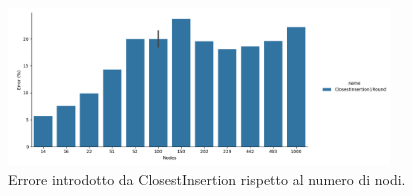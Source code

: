 \begin{figure}[!ht]
    \centering

    \includegraphics[width=0.9\textwidth]{./images/ClosestInsertion1Round__approximation_error_.png}

    \caption{Errore introdotto da ClosestInsertion rispetto al numero di nodi.}
    \label{fig:closest-insertion-1-round-accuracy-error}
\end{figure}
